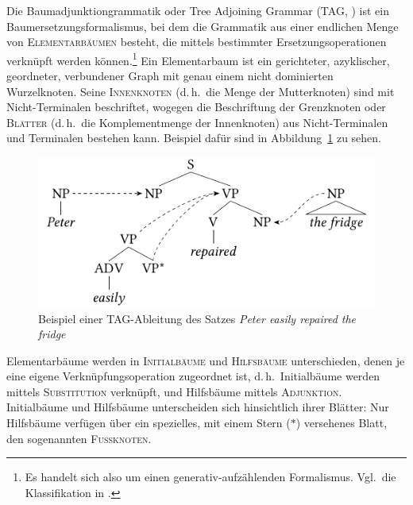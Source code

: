 Die Baumadjunktiongrammatik oder Tree Adjoining Grammar (TAG, \citealt{Joshi:etal:75,Joshi:Schabes:97}) ist ein Baumersetzungsformalismus, bei dem die Grammatik aus einer endlichen Menge von \textsc{Elementarbäumen} besteht, die mittels bestimmter Ersetzungsoperationen verknüpft werden können.\footnote{Es handelt sich also um einen generativ-aufzählenden Formalismus. Vgl.\ die Klassifikation in \cite{Pullum:Scholz:01}.} Ein Elementarbaum ist ein gerichteter, azyklischer, geordneter, verbundener Graph mit genau einem nicht dominierten Wurzelknoten. Seine \textsc{Innenknoten} (d.\,h.\ die Menge der Mutterknoten) sind mit Nicht-Terminalen beschriftet, wogegen die Beschriftung der Grenzknoten oder \textsc{Blätter} (d.\,h.\ die Komplementmenge der Innenknoten) aus Nicht-Terminalen und Terminalen bestehen kann. Beispiel dafür sind in Abbildung~\ref{fig-TAG-bsp1} zu sehen. %
\begin{figure}[t]
\centering
\includegraphics{graphics/abb51.pdf}
\caption{\label{fig-TAG-bsp1}Beispiel einer TAG-Ableitung des Satzes {\it Peter easily repaired the fridge}}
\end{figure}
Elementarbäume werden in \textsc{Initialbäume} und \textsc{Hilfsbäume} unterschieden, denen je eine eigene Verknüpfungsoperation zugeordnet ist, d.\,h.\ Initialbäume werden mittels \textsc{ Substitution} verknüpft, und Hilfsbäume mittels \textsc{Adjunktion}. Initialbäume und Hilfsbäume unterscheiden sich hinsichtlich ihrer Blätter: Nur Hilfsbäume verfügen über ein spezielles, mit einem Stern ($\ast$) versehenes Blatt, den sogenannten \textsc{Fu\ss knoten}.  

